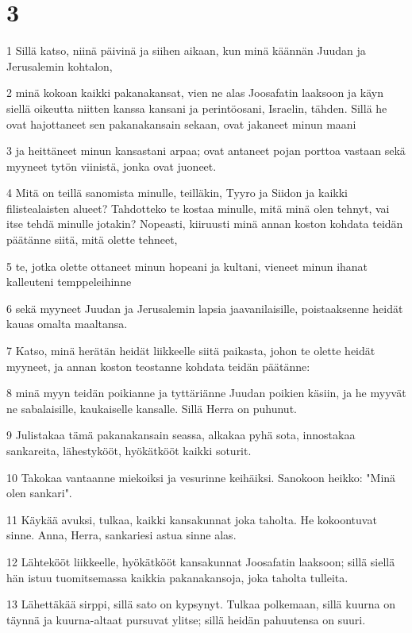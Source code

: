 \chapter{3}

\par 1 Sillä katso, niinä päivinä ja siihen aikaan, kun minä käännän Juudan ja Jerusalemin kohtalon,
\par 2 minä kokoan kaikki pakanakansat, vien ne alas Joosafatin laaksoon ja käyn siellä oikeutta niitten kanssa kansani ja perintöosani, Israelin, tähden. Sillä he ovat hajottaneet sen pakanakansain sekaan, ovat jakaneet minun maani
\par 3 ja heittäneet minun kansastani arpaa; ovat antaneet pojan porttoa vastaan sekä myyneet tytön viinistä, jonka ovat juoneet.
\par 4 Mitä on teillä sanomista minulle, teilläkin, Tyyro ja Siidon ja kaikki filistealaisten alueet? Tahdotteko te kostaa minulle, mitä minä olen tehnyt, vai itse tehdä minulle jotakin? Nopeasti, kiiruusti minä annan koston kohdata teidän päätänne siitä, mitä olette tehneet,
\par 5 te, jotka olette ottaneet minun hopeani ja kultani, vieneet minun ihanat kalleuteni temppeleihinne
\par 6 sekä myyneet Juudan ja Jerusalemin lapsia jaavanilaisille, poistaaksenne heidät kauas omalta maaltansa.
\par 7 Katso, minä herätän heidät liikkeelle siitä paikasta, johon te olette heidät myyneet, ja annan koston teostanne kohdata teidän päätänne:
\par 8 minä myyn teidän poikianne ja tyttäriänne Juudan poikien käsiin, ja he myyvät ne sabalaisille, kaukaiselle kansalle. Sillä Herra on puhunut.
\par 9 Julistakaa tämä pakanakansain seassa, alkakaa pyhä sota, innostakaa sankareita, lähestykööt, hyökätkööt kaikki soturit.
\par 10 Takokaa vantaanne miekoiksi ja vesurinne keihäiksi. Sanokoon heikko: "Minä olen sankari".
\par 11 Käykää avuksi, tulkaa, kaikki kansakunnat joka taholta. He kokoontuvat sinne. Anna, Herra, sankariesi astua sinne alas.
\par 12 Lähtekööt liikkeelle, hyökätkööt kansakunnat Joosafatin laaksoon; sillä siellä hän istuu tuomitsemassa kaikkia pakanakansoja, joka taholta tulleita.
\par 13 Lähettäkää sirppi, sillä sato on kypsynyt. Tulkaa polkemaan, sillä kuurna on täynnä ja kuurna-altaat pursuvat ylitse; sillä heidän pahuutensa on suuri.
